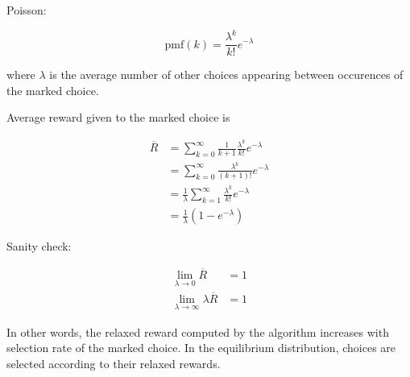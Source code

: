 \documentclass{article}
\begin{document}
Poisson:

\[\mathrm{pmf}(k) = \frac {\lambda^k} {k!} e^{-\lambda}\]

where $\lambda$ is the average number of other choices
appearing between occurences of the marked choice.

Average reward given to the marked choice is

\begin{align*}
	 \overline R & =  \sum_{k=0}^\infty \frac 1 {k+1} \frac {\lambda^k} {k!} e^{-\lambda} \\
				 & = \sum_{k=0}^\infty \frac {\lambda^k} {(k+1)!} e^{-\lambda} \\
		         & = \frac 1 \lambda \sum_{k=1}^\infty \frac {\lambda^k} {k!} e^{-\lambda} \\
	             & = \frac 1 \lambda \left(1 - e^{-\lambda}\right)
\end{align*}

Sanity check:

\begin{align*}
	\lim_{\lambda \to 0} \overline R & = 1 \\
	\lim_{\lambda \to \infty} \lambda {\overline R}  & = 1 
 \end{align*}

In other words, the relaxed reward computed by the algorithm increases
with selection rate of the marked choice. In the equilibrium distribution,
choices are selected according to their relaxed rewards.
\end{document}
